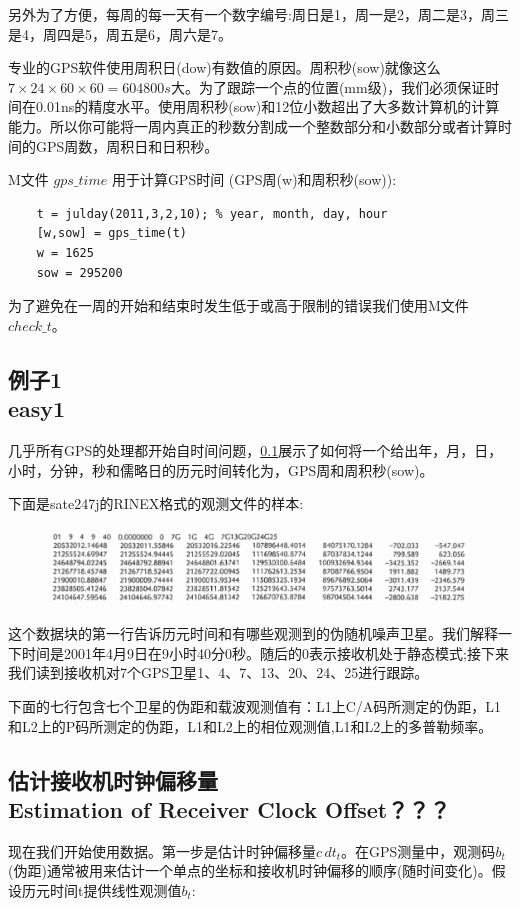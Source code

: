 	另外为了方便，每周的每一天有一个数字编号:周日是1，周一是2，周二是3，周三是4，周四是5，周五是6，周六是7。
	
	专业的GPS软件使用周积日(dow)有数值的原因。周积秒(sow)就像这么$7 \times 24 \times 60 \times 60 = 604 800 s$大。为了跟踪一个点的位置(mm级)，我们必须保证时间在0.01ns的精度水平。使用周积秒(sow)和12位小数超出了大多数计算机的计算能力。所以你可能将一周内真正的秒数分割成一个整数部分和小数部分或者计算时间的GPS周数，周积日和日积秒。
	
	M文件 $gps\_time$ 用于计算GPS时间 (GPS周(w)和周积秒(sow)):
	\begin{lstlisting} 
	t = julday(2011,3,2,10); % year, month, day, hour
	[w,sow] = gps_time(t)
	w = 1625
	sow = 295200
	\end{lstlisting}
	为了避免在一周的开始和结束时发生低于或高于限制的错误我们使用M文件$check\_t$。
	\subsection[例子1]{例子1\\easy1}\label{subsec:easy1}
	几乎所有GPS的处理都开始自时间问题，\ref{subsec:easy1}展示了如何将一个给出年，月，日，小时，分钟，秒和儒略日的历元时间转化为，GPS周和周积秒(sow)。
	
	下面是sate247j的RINEX格式的观测文件的样本:
	
	\begin{figure}
		\centering
		\includegraphics[width=1.0\linewidth]{TeX_files/Part03/chapter09/image/9-site247j}
	\end{figure}
	
	这个数据块的第一行告诉历元时间和有哪些观测到的伪随机噪声卫星。我们解释一下时间是2001年4月9日在9小时40分0秒。随后的0表示接收机处于静态模式;接下来我们读到接收机对7个GPS卫星1、4、7、13、20、24、25进行跟踪。
	
	下面的七行包含七个卫星的伪距和载波观测值有：L1上C/A码所测定的伪距，L1和L2上的P码所测定的伪距，L1和L2上的相位观测值,L1和L2上的多普勒频率。
	
	\subsection[估计接收机时钟偏移量]{估计接收机时钟偏移量\\Estimation of Receiver Clock Offset？？？}
	现在我们开始使用数据。第一步是估计时钟偏移量$c\,dt_t$。在GPS测量中，观测码$b_t$(伪距)通常被用来估计一个单点的坐标和接收机时钟偏移的顺序(随时间变化)。假设历元时间t提供线性观测值$b_t$:
	
